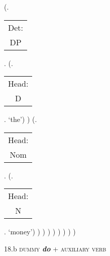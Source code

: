 \documentclass[12pt,letterpaper]{article}
\begin{document}
\begin{figure}
\begin{center}
\begin{parsetree}
			(.\begin{tabular}{c}Det:\\DP\end{tabular}.  
			(.\begin{tabular}{c}Head:\\D\end{tabular}. `the')
			)
			(.\begin{tabular}{c}Head:\\Nom\end{tabular}.
			(.\begin{tabular}{c}Head:\\N\end{tabular}. `money')
			)
			)
			)
			)
			)
			)
			)
			)
			
		\end{parsetree}
		\hfill \break \hfill \break
		18.b \textsc{dummy} \textit{\textbf{do}} + \textsc{auxiliary verb}
	\end{center}
\end{figure}
\end{document}
